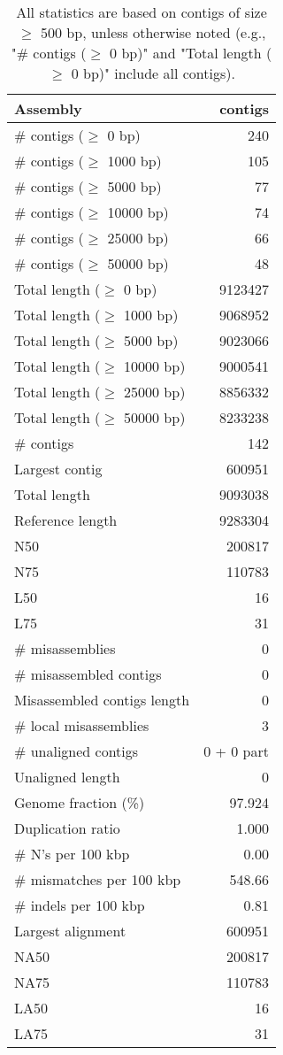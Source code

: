 \documentclass[12pt,a4paper]{article}
\begin{document}
\begin{table}[ht]
\begin{center}
\caption{All statistics are based on contigs of size $\geq$ 500 bp, unless otherwise noted (e.g., "\# contigs ($\geq$ 0 bp)" and "Total length ($\geq$ 0 bp)" include all contigs).}
\begin{tabular}{|l*{1}{|r}|}
\hline
Assembly & contigs \\ \hline
\# contigs ($\geq$ 0 bp) & 240 \\ \hline
\# contigs ($\geq$ 1000 bp) & 105 \\ \hline
\# contigs ($\geq$ 5000 bp) & 77 \\ \hline
\# contigs ($\geq$ 10000 bp) & 74 \\ \hline
\# contigs ($\geq$ 25000 bp) & 66 \\ \hline
\# contigs ($\geq$ 50000 bp) & 48 \\ \hline
Total length ($\geq$ 0 bp) & 9123427 \\ \hline
Total length ($\geq$ 1000 bp) & 9068952 \\ \hline
Total length ($\geq$ 5000 bp) & 9023066 \\ \hline
Total length ($\geq$ 10000 bp) & 9000541 \\ \hline
Total length ($\geq$ 25000 bp) & 8856332 \\ \hline
Total length ($\geq$ 50000 bp) & 8233238 \\ \hline
\# contigs & 142 \\ \hline
Largest contig & 600951 \\ \hline
Total length & 9093038 \\ \hline
Reference length & 9283304 \\ \hline
N50 & 200817 \\ \hline
N75 & 110783 \\ \hline
L50 & 16 \\ \hline
L75 & 31 \\ \hline
\# misassemblies & 0 \\ \hline
\# misassembled contigs & 0 \\ \hline
Misassembled contigs length & 0 \\ \hline
\# local misassemblies & 3 \\ \hline
\# unaligned contigs & 0 + 0 part \\ \hline
Unaligned length & 0 \\ \hline
Genome fraction (\%) & 97.924 \\ \hline
Duplication ratio & 1.000 \\ \hline
\# N's per 100 kbp & 0.00 \\ \hline
\# mismatches per 100 kbp & 548.66 \\ \hline
\# indels per 100 kbp & 0.81 \\ \hline
Largest alignment & 600951 \\ \hline
NA50 & 200817 \\ \hline
NA75 & 110783 \\ \hline
LA50 & 16 \\ \hline
LA75 & 31 \\ \hline
\end{tabular}
\end{center}
\end{table}
\end{document}
